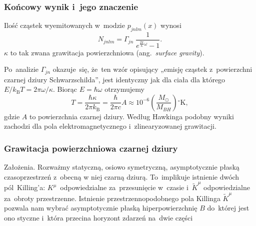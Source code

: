 \documentclass[10pt,t]{beamer}
\begin{document}
\begin{frame}
  \frametitle{Końcowy wynik i~jego znaczenie}


  Ilość cząstek wyemitowanych w~modzie $p_{ j n l m }( x )$ wynosi
  \begin{equation}
    \label{eq:HawkingPromieniowanie-48}
    N_{ j n l m } =
    \Gamma_{ j n }\; \frac{ 1 }{ e^{  \frac{ 2 \pi }{ \kappa } \omega } - 1 }.
  \end{equation}
  $\kappa$ to tak zwana grawitacja powierzchniowa (ang.~\textit{surface
  gravity}).

  Po~analizie $\Gamma_{ j n }$ okazuje~się, że~ten wzór opisujący
  „emisję cząstek z~powierzchni czarnej dziury Schwarzschilda”, jest
  identyczny jak dla ciała dla którego $E / k_{ \textrm{B} } T = 2\pi \omega / \kappa$.
  Biorąc $E = \hbar \omega$ otrzymujemy
  \begin{equation}
    \label{eq:HawkingPromieniowanie-49}
    T =
    \frac{ \hbar \kappa }{ 2\pi k_{ \mathrm{B} } } =
    \frac{ \hbar }{ 2\pi c } A \approx
    10^{ -6 } \left( \frac{ M_{ \odot } }{ M_{ BH } } \right)
    {}^{ \circ } \mathrm{K},
  \end{equation}
  gdzie $A$ to powierzchnia czarnej dziury. Według Hawkinga podobny
  wyniki zachodzi dla pola elektromagnetycznego i~zlinearyzowanej
  grawitacji.

\end{frame}





\begin{frame}
  \frametitle{Grawitacja powierzchniowa czarnej dziury}


  Założenia. Rozważmy statyczną, osiowo symetryczną, asymptotycznie płaską
  czasoprzestrzeń z~obecną w niej czarną dziurą. To~implikuje
  istnienie dwóch pól~Killing'a: $K^{ \mu }$~odpowiedzialne
  za~przesunięcie w~czasie i~$\tilde{ K }^{ \mu }$ odpowiedzialne
  za~obroty przestrzenne. Istnienie przestrzennopodobnego pola
  Killinga $\tilde{ K }^{ \mu }$ pozwala nam wybrać asymptotycznie
  płaską hiperpowierzchnię $B$ do~której jest ono styczne i~która
  przecina horyzont zdarzeń na~dwie części

\end{frame}
\end{document}
